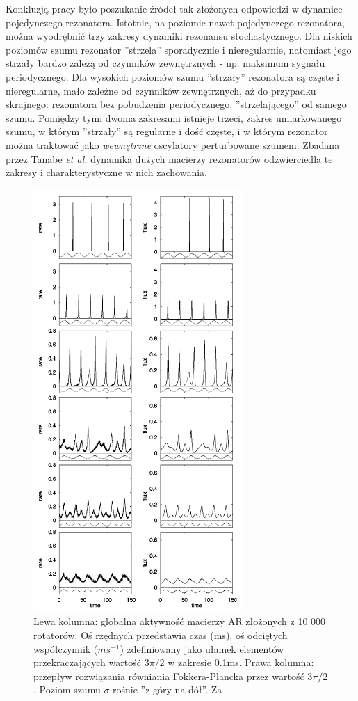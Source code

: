   Konkluzją pracy było poszukanie źródeł tak złożonych odpowiedzi w dynamice pojedynczego rezonatora. Istotnie, na poziomie nawet pojedynczego rezonatora, można wyodrębnić trzy zakresy dynamiki rezonansu stochastycznego. Dla niskich poziomów szumu rezonator ''strzela'' sporadycznie i nieregularnie, natomiast jego strzały bardzo zależą od czynników zewnętrznych - np. maksimum sygnału periodycznego. Dla wysokich poziomów szumu ''strzały'' rezonatora są częste i nieregularne, mało zależne od czynników zewnętrznych, aż do przypadku skrajnego: rezonatora bez pobudzenia periodycznego, ''strzelającego'' od samego szumu. Pomiędzy tymi dwoma zakresami istnieje trzeci, zakres umiarkowanego szumu, w którym ''strzały'' są regularne i dość częste, i w którym rezonator można traktować jako \emph{wewnętrzne} oscylatory perturbowane szumem. Zbadana przez Tanabe \emph{et al.} dynamika dużych macierzy rezonatorów odzwierciedla te zakresy i charakterystyczne w nich zachowania.

  \begin{figure}
    \includegraphics[width=80mm]{images/tanabe.png}
    \caption{Lewa kolumna: globalna aktywność macierzy AR złożonych z 10 000 rotatorów. Oś rzędnych przedstawia czas (ms), oś odciętych współczynnik ($ms^{-1}$) zdefiniowany jako ułamek elementów przekraczających wartość $3 \pi / 2$ w zakresie 0.1ms. Prawa kolumna: przepływ rozwiązania równiania Fokkera-Plancka przez wartość $3 \pi / 2$. Poziom szumu $\sigma$ rośnie ''z góry na dół''. Za \cite{tanabe_shimokawa}}
    \label{fig:graphics:tanabe}
  \end{figure}

